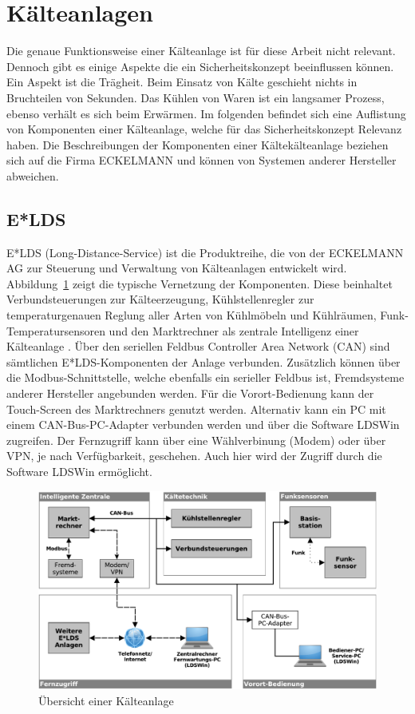 \documentclass[11pt,a4paper]{report}
\begin{document}
\section{Kälteanlagen}

Die genaue Funktionsweise einer Kälteanlage ist für diese Arbeit nicht relevant. Dennoch gibt es einige Aspekte die ein Sicherheitskonzept beeinflussen können. Ein Aspekt ist die Trägheit. Beim Einsatz von Kälte geschieht nichts in Bruchteilen von Sekunden. Das Kühlen von Waren ist ein langsamer Prozess, ebenso verhält es sich beim Erwärmen. Im folgenden befindet sich eine Auflistung von Komponenten einer Kälteanlage, welche für das Sicherheitskonzept Relevanz haben. Die Beschreibungen der Komponenten einer Kältekälteanlage beziehen sich auf die Firma ECKELMANN und können von Systemen anderer Hersteller abweichen.

\subsection{E*LDS}

E*LDS (Long-Distance-Service) ist die Produktreihe, die von der ECKELMANN AG zur Steuerung und Verwaltung von Kälteanlagen entwickelt wird. Abbildung~\ref{fig:kaelteanlage} zeigt die typische Vernetzung der Komponenten. Diese beinhaltet Verbundsteuerungen zur Kälteerzeugung, Kühlstellenregler zur temperaturgenauen Reglung aller Arten von Kühlmöbeln und Kühlräumen, Funk-Temperatursensoren und den Marktrechner als zentrale Intelligenz einer Kälteanlage \cite{elds}. Über den seriellen Feldbus Controller Area Network (CAN) sind sämtlichen E*LDS-Komponenten der Anlage verbunden. Zusätzlich können über die Modbus-Schnittstelle, welche ebenfalls ein serieller Feldbus ist, Fremdsysteme anderer Hersteller angebunden werden. Für die Vorort-Bedienung kann der Touch-Screen des Marktrechners genutzt werden. Alternativ kann ein PC mit einem CAN-Bus-PC-Adapter verbunden werden und über die Software LDSWin zugreifen. Der Fernzugriff kann über eine Wählverbinung (Modem) oder über VPN, je nach Verfügbarkeit, geschehen. Auch hier wird der Zugriff durch die Software LDSWin ermöglicht.

\begin{figure}[htbp]
\centering
\includegraphics[scale=0.65]{images/kaelteanlage_uebersicht.pdf}
\caption{Übersicht einer Kälteanlage}
\label{fig:kaelteanlage}
\end{figure}
\end{document}
